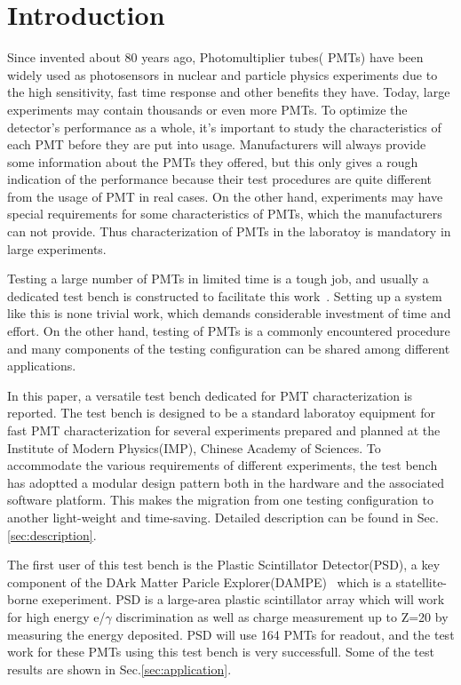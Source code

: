 \documentclass[5p, times]{elsarticle}
\begin{document}
\section{Introduction}
\label{sec:introduction}

Since invented about 80 years ago, Photomultiplier tubes( PMTs) have been widely used as photosensors in nuclear and particle physics experiments due to the high sensitivity, fast time response and other benefits they have.
Today, large experiments may contain thousands or even more PMTs.
To optimize the detector's performance as a whole, it's important to study the characteristics of each PMT before they are put into usage. 
Manufacturers will always provide some information about the PMTs they offered, but this only gives a rough indication of the performance because their test procedures are quite different from the usage of PMT in real cases.
On the other hand, experiments may have special requirements for some characteristics of PMTs, which the manufacturers can not provide. 
Thus characterization of PMTs in the laboratoy is mandatory in large experiments.

Testing a large number of PMTs in limited time is a tough job, and usually a dedicated test bench is constructed to facilitate this work~\cite{barnhill_testing_2008,akgun_complete_2005,adragna_pmt-block_2006}.
Setting up a system like this is none trivial work, which demands considerable investment of time and effort.
On the other hand, testing of PMTs is a commonly encountered procedure and many components of the testing configuration can be shared among different applications.

In this paper, a versatile test bench dedicated for PMT characterization is reported.
The test bench is designed to be a standard laboratoy equipment for fast PMT characterization for several experiments prepared and planned at the Institute of Modern Physics(IMP), Chinese Academy of Sciences.
To accommodate the various requirements of different experiments, the test bench has adoptted a modular design pattern both in the hardware and the associated software platform.
This makes the migration from one testing configuration to another light-weight and time-saving.
Detailed description can be found in Sec.\ref{sec:description}.

The first user of this test bench is the Plastic Scintillator Detector(PSD), a key component of the DArk Matter Paricle Explorer(DAMPE)~\cite{Chang_Jin_dampe} which is a statellite-borne exeperiment. 
PSD is a large-area plastic scintillator array which will work for high energy e/$\gamma$ discrimination as well as charge measurement up to Z=20 by measuring the energy deposited.
PSD will use 164 PMTs for readout, and the test work for these PMTs using this test bench is very successfull. 
Some of the test results are shown in Sec.\ref{sec:application}.
\end{document}
